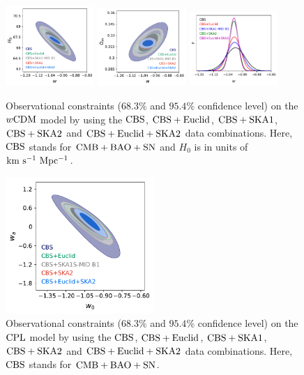 \documentclass[aps,prd,amsmath,amssymb,showpacs,floats,floatfix,nofootinbib,reprint]{revtex4-1}
\begin{document}
\begin{figure}%
\includegraphics[width=0.3\textwidth]{wcdmh.pdf}
\includegraphics[width=0.3\textwidth]{wcdmOmega_m.pdf}
\includegraphics[width=0.3\textwidth]{wcdmneww.pdf}
\caption{Observational constraints ($68.3\%$ and $95.4\%$ confidence level) on the ${ w\rm CDM}$ model by using the ${\rm CBS}$, ${\rm CBS+Euclid}$, ${\rm CBS+SKA1}$, ${\rm CBS+SKA2}$ and ${\rm CBS+Euclid+SKA2}$ data combinations. Here, ${\rm CBS}$ stands for ${\rm CMB+BAO+SN}$ and $H_0$ is in units of ${\rm km\ s^{-1}\ Mpc^{-1}}$.}
\label{fig2}
\end{figure}

\begin{figure}%
\includegraphics[width=0.5\textwidth]{cplw0wa.pdf}
\caption{Observational constraints ($68.3\%$ and $95.4\%$ confidence level) on the ${\rm CPL}$ model by using the ${\rm CBS}$, ${\rm CBS+Euclid}$, ${\rm CBS+SKA1}$, ${\rm CBS+SKA2}$ and ${\rm CBS+Euclid+SKA2}$ data combinations. Here, ${\rm CBS}$ stands for ${\rm CMB+BAO+SN}$.}
\label{fig3}
\end{figure}
\end{document}
